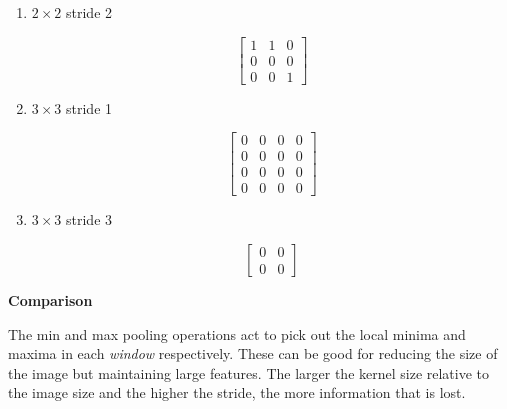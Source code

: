 \documentclass[12pt,a4paper]{article}
\begin{document}
\begin{enumerate}
\begin{enumerate}
\begin{enumerate}
                                  \item $2 \times 2 $ stride 2

                                        \[
                                        \begin{bmatrix}
                                          1 & 1 & 0 \\
                                          0 & 0 & 0 \\
                                          0 & 0 & 1
                                        \end{bmatrix}
                                        \]


                                  \item $3\times 3$ stride 1

                                        \[
                                        \begin{bmatrix}
                                          0 & 0 & 0 & 0 \\
                                          0 & 0 & 0 & 0 \\
                                          0 & 0 & 0 & 0 \\
                                          0 & 0 & 0 & 0
                                        \end{bmatrix}
                                        \]


                                  \item $3\times 3$ stride 3

                                        \[
                                        \begin{bmatrix}
                                          0 & 0 \\
                                          0 & 0
                                        \end{bmatrix}
                                        \]

                                \end{enumerate}

                        \textbf{Comparison}

                        The min and max pooling operations act to pick out the local minima and maxima in each \textit{window} respectively. These can be good for reducing the size of the image but maintaining large features. The larger the kernel size relative to the image size and the higher the stride, the more information that is lost.


\end{enumerate}
\end{enumerate}
\end{document}
